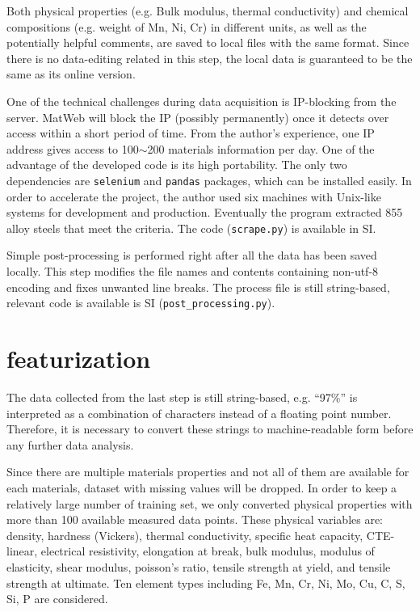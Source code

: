 \documentclass[10pt,aps,prb,amsmath,amssymb,twocolumn,letterpaper,nobalancelastpage,final,citeautoscript,floatfix,raggedbottom,superscriptaddress]{revtex4-1}
\begin{document}
Both physical properties (e.g. Bulk modulus, thermal conductivity) and chemical compositions (e.g. weight of Mn, Ni, Cr) in different units, as well as the potentially helpful comments, are saved to local files with the same format. Since there is no data-editing related in this step, the local data is guaranteed to be the same as its online version.

One of the technical challenges during data acquisition is IP-blocking from the server. MatWeb will block the IP (possibly permanently) once it detects over access within a short period of time. From the author's experience, one IP address gives access to 100$\sim$200 materials information per day. One of the advantage of the developed code is its high portability. The only two dependencies are \texttt{selenium} and \texttt{pandas} packages, which can be installed easily. In order to accelerate the project, the author used six machines with Unix-like systems for development and production. Eventually the program extracted 855 alloy steels that meet the criteria. The code (\texttt{scrape.py}) is available in SI.

Simple post-processing is performed right after all the data has been saved locally. This step modifies the file names and contents containing non-utf-8 encoding and fixes unwanted line breaks. The process file is still string-based, relevant code is available is SI (\texttt{post\_processing.py}).

\section{featurization}

The data collected from the last step is still string-based, e.g. ``97\%'' is interpreted as a combination of characters instead of a floating point number. Therefore, it is necessary to convert these strings to machine-readable form before any further data analysis.

Since there are multiple materials properties and not all of them are available for each materials, dataset with missing values will be dropped. In order to keep a relatively large number of training set, we only converted physical properties with more than 100 available measured data points. These physical variables are: density, hardness (Vickers), thermal conductivity, specific heat capacity, CTE-linear, electrical resistivity, elongation at break, bulk modulus, modulus of elasticity, shear modulus, poisson's ratio, tensile strength at yield, and tensile strength at ultimate. Ten element types including Fe, Mn, Cr, Ni, Mo, Cu, C, S, Si, P are considered.
\end{document}
